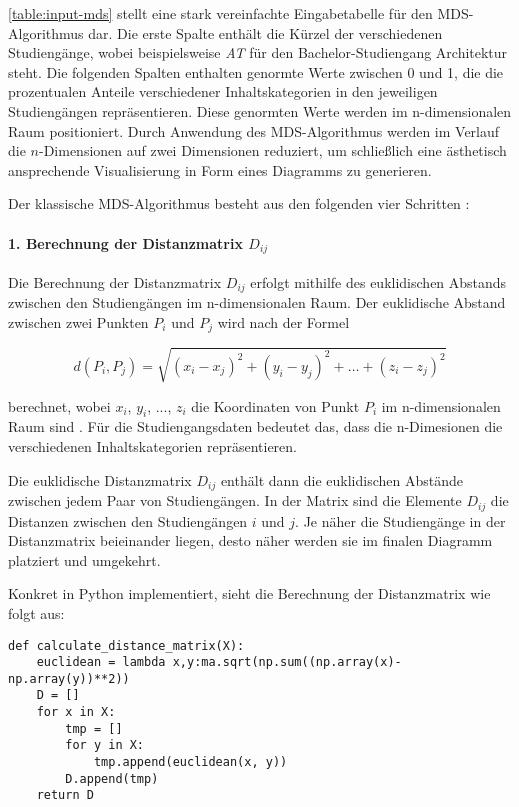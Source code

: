 \autoref{table:input-mds} stellt eine stark vereinfachte Eingabetabelle für den
MDS-Algorithmus dar. Die erste Spalte enthält die Kürzel der verschiedenen
Studiengänge, wobei beispielsweise \textit{AT} für den Bachelor-Studiengang
Architektur steht. Die folgenden Spalten enthalten genormte Werte zwischen 0 und
1, die die prozentualen Anteile verschiedener Inhaltskategorien in den
jeweiligen Studiengängen repräsentieren. Diese genormten Werte werden im
n-dimensionalen Raum positioniert. Durch Anwendung des MDS-Algorithmus werden im
Verlauf die $n$-Dimensionen auf zwei Dimensionen reduziert, um schließlich eine
ästhetisch ansprechende Visualisierung in Form eines Diagramms zu generieren.

Der klassische MDS-Algorithmus besteht aus den folgenden vier Schritten
\parencite{mds-for-dimensionality-reduction}:

\paragraph*{1. Berechnung der Distanzmatrix $ D_{ij} $}\label{sec:distanzmatrix}
Die Berechnung der Distanzmatrix $ D_{ij} $ erfolgt mithilfe des euklidischen
Abstands zwischen den Studiengängen im n-dimensionalen Raum. Der euklidische
Abstand zwischen zwei Punkten $ P_{i} $ und $ P_{j} $ wird nach der Formel

$$ d(P_i, P_j) = \sqrt{(x_i - x_j)^2 + (y_i - y_j)^2 + \ldots + (z_i - z_j)^2} $$

berechnet, wobei $ x_{i} $, $ y_{i} $, ..., $ z_{i} $ die Koordinaten von Punkt
$ P_{i} $ im n-dimensionalen Raum sind \parencite{mds-ceopedia}. Für die
Studiengangsdaten bedeutet das, dass die n-Dimesionen die verschiedenen
Inhaltskategorien repräsentieren.

Die euklidische Distanzmatrix $ D_{ij} $ enthält dann die euklidischen Abstände
zwischen jedem Paar von Studiengängen. In der Matrix sind die Elemente
$ D_{ij} $ die Distanzen zwischen den Studiengängen $ i $ und $ j $. Je näher
die Studiengänge in der Distanzmatrix beieinander liegen, desto näher werden sie
im finalen Diagramm platziert und umgekehrt.

Konkret in Python implementiert, sieht die Berechnung der Distanzmatrix wie
folgt aus:

\begin{lstlisting}[style=Python]
def calculate_distance_matrix(X):
    euclidean = lambda x,y:ma.sqrt(np.sum((np.array(x)-np.array(y))**2))
    D = []
    for x in X:
        tmp = []
        for y in X:
            tmp.append(euclidean(x, y))
        D.append(tmp)
    return D
\end{lstlisting}

